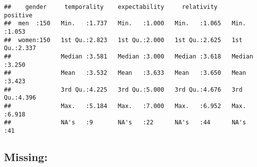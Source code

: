 \documentclass[
]{article}
\newenvironment{Shaded}{\begin{snugshade}}{\end{snugshade}}
\newcommand{\CommentTok}[1]{\textcolor[rgb]{0.56,0.35,0.01}{\textit{#1}}}
\newcommand{\DecValTok}[1]{\textcolor[rgb]{0.00,0.00,0.81}{#1}}
\newcommand{\KeywordTok}[1]{\textcolor[rgb]{0.13,0.29,0.53}{\textbf{#1}}}
\newcommand{\NormalTok}[1]{#1}
\newcommand{\OperatorTok}[1]{\textcolor[rgb]{0.81,0.36,0.00}{\textbf{#1}}}
\newcommand{\OtherTok}[1]{\textcolor[rgb]{0.56,0.35,0.01}{#1}}
\newcommand{\StringTok}[1]{\textcolor[rgb]{0.31,0.60,0.02}{#1}}
\begin{document}
\begin{Shaded}
\end{Shaded}

\begin{verbatim}
##    gender     temporality    expectability     relativity       positive    
##  men  :150   Min.   :1.737   Min.   :1.000   Min.   :1.065   Min.   :1.053  
##  women:150   1st Qu.:2.823   1st Qu.:2.000   1st Qu.:2.625   1st Qu.:2.337  
##              Median :3.581   Median :3.000   Median :3.618   Median :3.250  
##              Mean   :3.532   Mean   :3.633   Mean   :3.650   Mean   :3.423  
##              3rd Qu.:4.225   3rd Qu.:5.000   3rd Qu.:4.676   3rd Qu.:4.396  
##              Max.   :5.184   Max.   :7.000   Max.   :6.952   Max.   :6.918  
##              NA's   :9       NA's   :22      NA's   :44      NA's   :41
\end{verbatim}

\hypertarget{missing}{%
\subsection{Missing:}\label{missing}}
\end{document}
